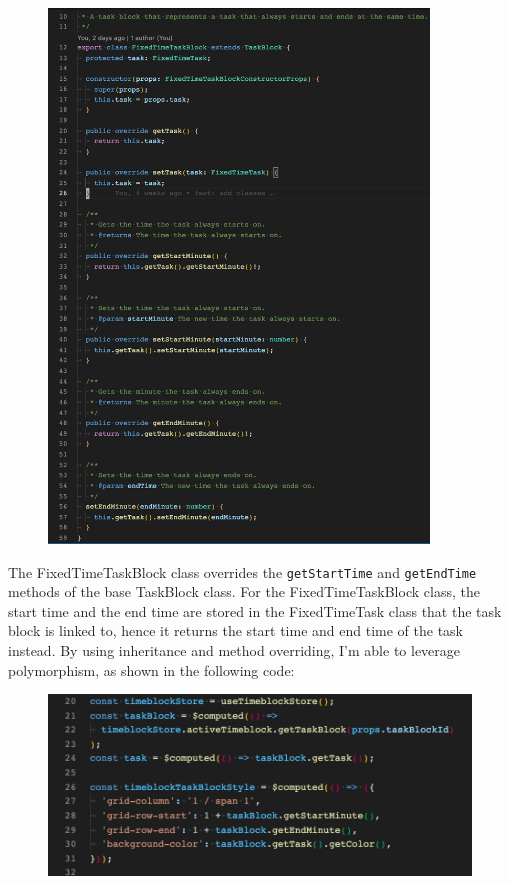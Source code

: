 \documentclass[notitlepage, 12pt]{report}
\newcommand{\code}[1]{\texttt{#1}}
\begin{document}
\begin{figure}[H]
	\centering
	\includegraphics[width=0.9\textwidth]{inheritance.png}
\end{figure}

The FixedTimeTaskBlock class overrides the \code{getStartTime} and \code{getEndTime} methods of the base TaskBlock class. For the FixedTimeTaskBlock class, the start time and the end time are stored in the FixedTimeTask class that the task block is linked to, hence it returns the start time and end time of the task instead. By using inheritance and method overriding, I'm able to leverage polymorphism, as shown in the following code:

\begin{figure}[H]
	\includegraphics[width=\textwidth]{polymorphism.png}
\end{figure}
\end{document}
